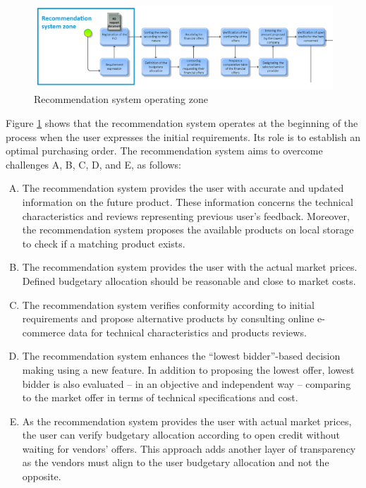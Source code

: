 \documentclass[preprint,3p,onecolumn]{elsarticle}
\begin{document}
\begin{figure}[H]
\centering
\includegraphics[scale=.3]{zone}
\caption{Recommendation system operating zone}
\label{zone_figure}
\end{figure}

\par Figure \ref{zone_figure} shows that the recommendation system operates at the beginning of the process when the user expresses the initial requirements. Its role is to establish an optimal purchasing order. The recommendation system aims to overcome challenges A, B, C, D, and E, as follows:
\begin{enumerate}[A.]
\item The recommendation system provides the user with accurate and updated information on the future product. These information concerns the technical characteristics and reviews representing previous user's feedback. Moreover, the recommendation system proposes the available products on local storage to check if a matching product exists.
\item The recommendation system provides the user with the actual market prices. Defined budgetary allocation should be reasonable and close to market costs.
\item The recommendation system verifies conformity according to initial requirements and propose alternative products by consulting online e-commerce data for technical characteristics and products reviews.
\item The recommendation system enhances the “lowest bidder”-based decision making using a new feature. In addition to proposing the lowest offer, lowest bidder is also evaluated -- in an objective and independent way -- comparing to the market offer in terms of technical specifications and cost. 
\item As the recommendation system provides the user with actual market prices, the user can verify budgetary allocation according to open credit without waiting for vendors’ offers. This approach adds another layer of transparency as the vendors must align to the user budgetary allocation and not the opposite. 
\end{enumerate}
\end{document}
